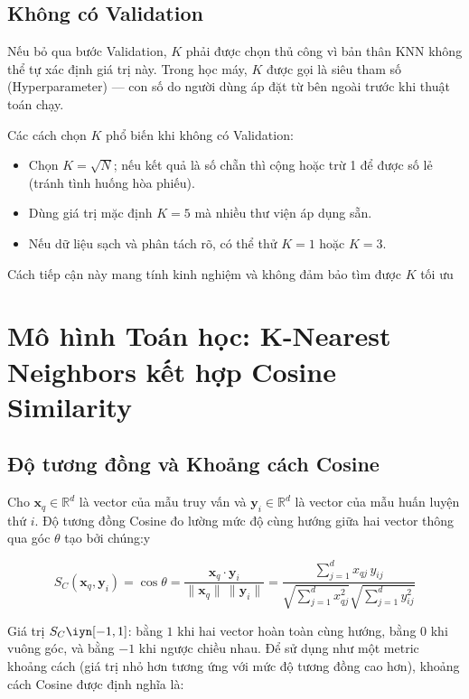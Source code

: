 \documentclass[12pt,a4paper]{article}
\begin{document}
\subsection{Không có Validation}

Nếu bỏ qua bước Validation, $K$ phải được chọn thủ công vì bản thân KNN không thể tự xác định giá trị này. Trong học máy, $K$ được gọi là siêu tham số (Hyperparameter) — con số do người dùng áp đặt từ bên ngoài trước khi thuật toán chạy.

Các cách chọn $K$ phổ biến khi không có Validation:
\begin{itemize}
    \item Chọn $K = \sqrt{N}$; nếu kết quả là số chẵn thì cộng hoặc trừ 1 để được số lẻ (tránh tình huống hòa phiếu).
    \item Dùng giá trị mặc định $K = 5$ mà nhiều thư viện áp dụng sẵn.
    \item Nếu dữ liệu sạch và phân tách rõ, có thể thử $K = 1$ hoặc $K = 3$.
\end{itemize}

Cách tiếp cận này mang tính kinh nghiệm và không đảm bảo tìm được $K$ tối ưu

\section{Mô hình Toán học: K-Nearest Neighbors kết hợp Cosine Similarity}
\subsection{Độ tương đồng và Khoảng cách Cosine}

Cho $\mathbf{x}_q \in \mathbb{R}^d$ là vector của mẫu truy vấn và
$\mathbf{y}_i \in \mathbb{R}^d$ là vector của mẫu huấn luyện thứ $i$.
Độ tương đồng Cosine đo lường mức độ cùng hướng giữa hai vector thông
qua góc $\theta$ tạo bởi chúng:y

\begin{equation}
    S_C(\mathbf{x}_q, \mathbf{y}_i)
    = \cos\theta
    = \frac{\mathbf{x}_q \cdot \mathbf{y}_i}
           {\|\mathbf{x}_q\|\,\|\mathbf{y}_i\|}
    = \frac{\displaystyle\sum_{j=1}^{d} x_{qj}\,y_{ij}}
           {\displaystyle\sqrt{\sum_{j=1}^{d} x_{qj}^2}
            \sqrt{\sum_{j=1}^{d} y_{ij}^2}}
\end{equation}

Giá trị $S_C \iyn [-1, 1]$: bằng $1$ khi hai vector hoàn toàn cùng hướng,
bằng $0$ khi vuông góc, và bằng $-1$ khi ngược chiều nhau. Để sử dụng
như một metric khoảng cách (giá trị nhỏ hơn tương ứng với mức độ tương
đồng cao hơn), khoảng cách Cosine được định nghĩa là:
\end{document}
